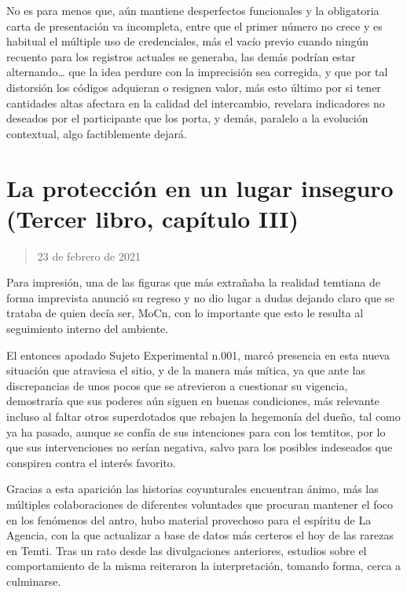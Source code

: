 \documentclass[
]{book}
\begin{document}
No es para menos que, aún mantiene desperfectos funcionales y la obligatoria carta de presentación va incompleta, entre que el primer número no crece y es habitual el múltiple uso de credenciales, más el vacío previo cuando ningún recuento para los registros actuales se generaba, las demás podrían estar alternando\ldots{} que la idea perdure con la imprecisión sea corregida, y que por tal distorsión los códigos adquieran o resignen valor, más esto último por si tener cantidades altas afectara en la calidad del intercambio, revelara indicadores no deseados por el participante que los porta, y demás, paralelo a la evolución contextual, algo factiblemente dejará.

\hypertarget{la-protecciuxf3n-en-un-lugar-inseguro-tercer-libro-capuxedtulo-iii}{%
\section{La protección en un lugar inseguro (Tercer libro, capítulo III)}\label{la-protecciuxf3n-en-un-lugar-inseguro-tercer-libro-capuxedtulo-iii}}

\begin{quote}
23 de febrero de 2021
\end{quote}

Para impresión, una de las figuras que más extrañaba la realidad temtiana de forma imprevista anunció su regreso y no dio lugar a dudas dejando claro que se trataba de quien decía ser, MoCn, con lo importante que esto le resulta al seguimiento interno del ambiente.

El entonces apodado Sujeto Experimental n.001, marcó presencia en esta nueva situación que atraviesa el sitio, y de la manera más mítica, ya que ante las discrepancias de unos pocos que se atrevieron a cuestionar su vigencia, demostraría que sus poderes aún siguen en buenas condiciones, más relevante incluso al faltar otros superdotados que rebajen la hegemonía del dueño, tal como ya ha pasado, aunque se confía de sus intenciones para con los temtitos, por lo que sus intervenciones no serían negativa, salvo para los posibles indeseados que conspiren contra el interés favorito.

Gracias a esta aparición las historias coyunturales encuentran ánimo, más las múltiples colaboraciones de diferentes voluntades que procuran mantener el foco en los fenómenos del antro, hubo material provechoso para el espíritu de La Agencia, con la que actualizar a base de datos más certeros el hoy de las rarezas en Temti. Tras un rato desde las divulgaciones anteriores, estudios sobre el comportamiento de la misma reiteraron la interpretación, tomando forma, cerca a culminarse.
\end{document}
